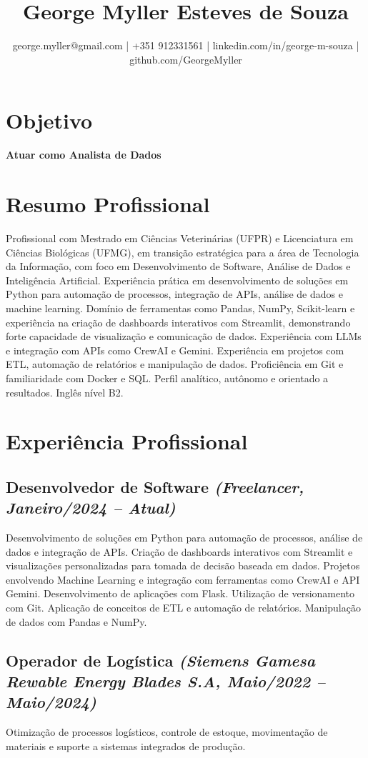 \documentclass{article}
\title{George Myller Esteves de Souza}
\author{george.myller@gmail.com | +351 912331561 | linkedin.com/in/george-m-souza | github.com/GeorgeMyller}
\begin{document}
\maketitle

\section*{Objetivo}
\textbf{Atuar como Analista de Dados}

\section*{Resumo Profissional}
Profissional com Mestrado em Ciências Veterinárias (UFPR) e Licenciatura em Ciências Biológicas (UFMG), em transição estratégica para a área de Tecnologia da Informação, com foco em Desenvolvimento de Software, Análise de Dados e Inteligência Artificial. Experiência prática em desenvolvimento de soluções em Python para automação de processos, integração de APIs, análise de dados e machine learning.  Domínio de ferramentas como Pandas, NumPy, Scikit-learn e experiência na criação de dashboards interativos com Streamlit, demonstrando forte capacidade de visualização e comunicação de dados. Experiência com LLMs e integração com APIs como CrewAI e Gemini. Experiência em projetos com ETL, automação de relatórios e manipulação de dados.  Proficiência em Git e familiaridade com Docker e SQL. Perfil analítico, autônomo e orientado a resultados. Inglês nível B2.

\section*{Experiência Profissional}
\subsection*{Desenvolvedor de Software \textit{(Freelancer, Janeiro/2024 – Atual)}}
Desenvolvimento de soluções em Python para automação de processos, análise de dados e integração de APIs. Criação de dashboards interativos com Streamlit e visualizações personalizadas para tomada de decisão baseada em dados. Projetos envolvendo Machine Learning e integração com ferramentas como CrewAI e API Gemini. Desenvolvimento de aplicações com Flask.  Utilização de versionamento com Git. Aplicação de conceitos de ETL e automação de relatórios. Manipulação de dados com Pandas e NumPy.
\subsection*{Operador de Logística \textit{(Siemens Gamesa Rewable Energy Blades S.A, Maio/2022 – Maio/2024)}}
Otimização de processos logísticos, controle de estoque, movimentação de materiais e suporte a sistemas integrados de produção.
\end{document}
